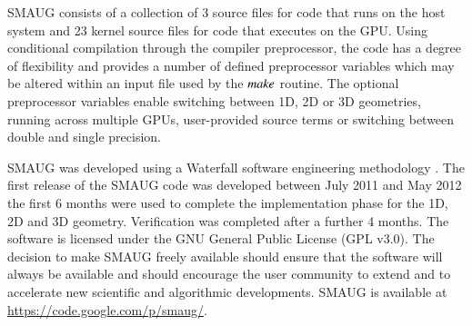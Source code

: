 \documentclass[final,1p]{elsarticle}
\begin{document}






SMAUG consists of a collection of  3 source files for code that runs on the host system and 23 kernel source files for code that executes on the GPU. Using conditional compilation through the compiler preprocessor, the code has a degree of flexibility and provides a number of defined preprocessor variables which may be altered within an input file used by the $\it{make}$ routine. The optional preprocessor variables enable switching between 1D, 2D or 3D geometries, running across multiple GPUs, user-provided source terms or switching between double and single precision.





SMAUG was developed using a Waterfall software engineering methodology \cite{Pressman1997}. The first release of the SMAUG code was developed between July 2011 and May 2012 the first 6 months were used to complete the implementation phase for the 1D, 2D and 3D geometry. Verification was completed after a further 4 months. The software is licensed under the GNU General Public License (GPL v3.0). The decision to make SMAUG freely available should ensure that the software will always be available and should encourage the user community to extend  and to accelerate new scientific and algorithmic developments. SMAUG is available at \href{https://code.google.com/p/smaug/}{https://code.google.com/p/smaug/}. 
\end{document}

